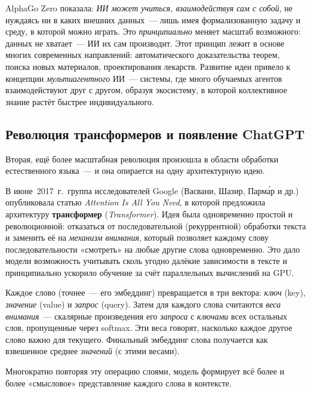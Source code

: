 \begin{notebox}[title={Главный урок AlphaGo Zero}]
AlphaGo Zero показала: \emph{ИИ может учиться, взаимодействуя сам с
собой}, не нуждаясь ни в каких внешних данных~--- лишь имея
формализованную задачу и среду, в которой можно играть. Это
\emph{принципиально} меняет масштаб возможного: данных не хватает~---
ИИ их сам производит. Этот принцип лежит в основе многих современных
направлений: автоматического доказательства теорем, поиска новых
материалов, проектирования лекарств. Развитие идеи привело к концепции
\emph{мультиагентного} ИИ~--- системы, где много обучаемых агентов
взаимодействуют друг с другом, образуя экосистему, в которой
коллективное знание растёт быстрее индивидуального.
\end{notebox}

\subsection{Революция трансформеров и появление ChatGPT}
\label{ssec:transformers}

Вторая, ещё более масштабная революция произошла в области обработки
естественного языка~--- и она опирается на одну архитектурную идею.

В июне~2017~г.\ группа исследователей Google (Васвани, Шазир, Парма́р
и др.) опубликовала статью \emph{Attention Is All You Need}, в которой
предложила архитектуру \textbf{трансформер} (\emph{Transformer}). Идея
была одновременно простой и революционной: отказаться от
последовательной (рекуррентной) обработки текста и заменить её на
\emph{механизм внимания}, который позволяет каждому слову
последовательности «смотреть» на любые другие слова одновременно. Это
дало модели возможность учитывать сколь угодно далёкие зависимости в
тексте и принципиально ускорило обучение за счёт параллельных
вычислений на GPU.

\begin{notebox}[title={Механизм внимания: интуиция}]
Каждое слово (точнее~--- его эмбеддинг) превращается в три вектора:
\emph{ключ} (key), \emph{значение} (value) и \emph{запрос} (query).
Затем для каждого слова считаются \emph{веса внимания}~--- скалярные
произведения его \emph{запроса} с \emph{ключами} всех остальных
слов, пропущенные через softmax. Эти веса говорят, насколько каждое
другое слово важно для текущего. Финальный эмбеддинг слова получается
как взвешенное среднее \emph{значений} (с этими весами).

Многократно повторяя эту операцию слоями, модель формирует всё более
и более «смысловое» представление каждого слова в контексте.
\end{notebox}

